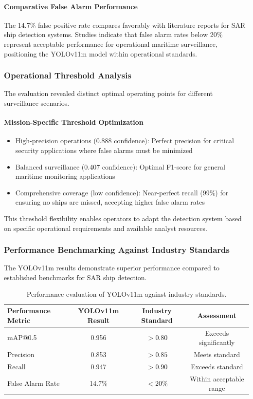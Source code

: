 \documentclass{article}
\begin{document}
	\paragraph{Comparative False Alarm Performance}
	The 14.7\% false positive rate compares favorably with literature reports for SAR ship detection systems. Studies indicate that false alarm rates below 20\% represent acceptable performance for operational maritime surveillance, positioning the YOLOv11m model within operational standards.
	
	\subsubsection{Operational Threshold Analysis}
	The evaluation revealed distinct optimal operating points for different surveillance scenarios.
	
	\paragraph{Mission-Specific Threshold Optimization}
	\begin{itemize}
		\item High-precision operations (0.888 confidence): Perfect precision for critical security applications where false alarms must be minimized
		\item Balanced surveillance (0.407 confidence): Optimal F1-score for general maritime monitoring applications
		\item Comprehensive coverage (low confidence): Near-perfect recall (99\%) for ensuring no ships are missed, accepting higher false alarm rates
	\end{itemize}
	
	This threshold flexibility enables operators to adapt the detection system based on specific operational requirements and available analyst resources.
	
	\subsubsection{Performance Benchmarking Against Industry Standards}
	The YOLOv11m results demonstrate superior performance compared to established benchmarks for SAR ship detection.
	
	
	\begin{table}[h!]
		\centering
		\begin{tabular}{>{\raggedright}p{4cm} c c c}
			\toprule
			\textbf{Performance Metric} & \textbf{YOLOv11m Result} & \textbf{Industry Standard} & \textbf{Assessment} \\
			\midrule
			mAP@0.5           & 0.956  & $> 0.80$   & Exceeds significantly \\
			Precision         & 0.853  & $> 0.85$   & Meets standard \\
			Recall            & 0.947  & $> 0.90$   & Exceeds standard \\
			False Alarm Rate  & 14.7\% & $< 20\%$   & Within acceptable range \\
			\bottomrule
		\end{tabular}
		\caption{Performance evaluation of YOLOv11m against industry standards.}
	\end{table}
	
\end{document}
